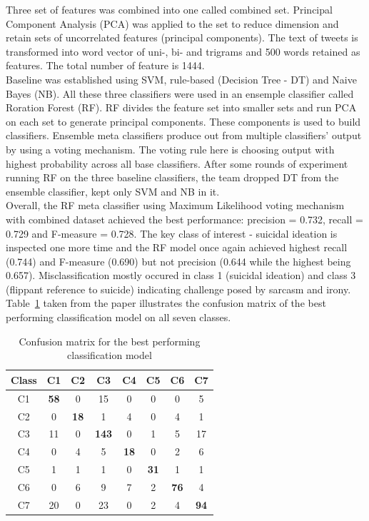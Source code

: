 Three set of features was combined into one called combined set. Principal Component Analysis (PCA) was applied to the set to reduce dimension and retain sets of uncorrelated features (principal components). The text of tweets is transformed into word vector of uni-, bi- and trigrams and 500 words retained as features. The total number of feature is 1444.\\
Baseline was established using SVM, rule-based (Decision Tree - DT) and Naive Bayes (NB). All these three classifiers were used in an ensemple classifier called Roration Forest (RF). RF divides the feature set into smaller sets and run PCA on each set to generate principal components. These components is used to build classifiers. Ensemble meta classifiers produce out from multiple classifiers' output by using a voting mechanism. The voting rule here is choosing output with highest probability across all base classifiers. After some rounds of experiment running RF on the three baseline classifiers, the team dropped DT from the ensemble classifier, kept only SVM and NB in it.\\
Overall, the RF meta classifier using Maximum Likelihood voting mechanism with combined dataset achieved the best performance: precision = 0.732, recall = 0.729 and F-measure = 0.728. The key class of interest - suicidal ideation is inspected one more time and the RF model once again achieved highest recall (0.744) and F-measure (0.690) but not precision (0.644 while the highest being 0.657). Misclassification mostly occured in class 1 (suicidal ideation) and class 3 (flippant reference to suicide) indicating challenge posed by sarcasm and irony. Table~\ref{tab:confusion_matrix} taken from the paper \cite{Burnap2015} illustrates the confusion matrix of the best performing classification model on all seven classes.  

\begin{table}
\center
\small
\noindent\begin{tabularx}{0.5\textwidth}{cccccccc}

\toprule
Class & C1 & C2 & C3 & C4 & C5 & C6 & C7  \\ 
\midrule
C1  & \textbf{58} & 0 & 15 & 0 & 0 & 0 & 5\\
C2 & 0 &  \textbf{18} &  1 &  4 &  0 &  4 &  1 \\
C3 & 11 &  0 &  \textbf{143} &  0 &  1 &  5 &  17  \\
C4 & 0  &  4 &  5 &  \textbf{18} &  0 &  2 &  6\\
C5 & 1 &  1 &  1 &  0 &  \textbf{31} &  1 &  1\\
C6 & 0 &  6 &  9 &  7 &  2 &  \textbf{76} &  4 \\
C7 & 20 &  0 &  23 &  0 &  2 &  4 &  \textbf{94}\\
\bottomrule
\end{tabularx}
\caption{Confusion matrix for the best performing classification model \cite{Burnap2015}}
\label{tab:confusion_matrix}
\end{table}

